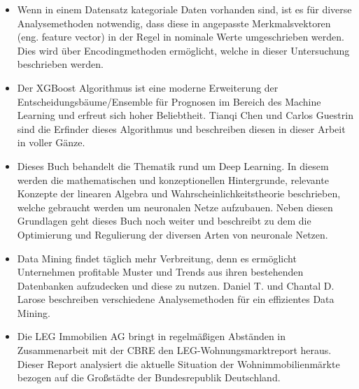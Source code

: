 \begin{itemize}
    \item Wenn in einem Datensatz kategoriale Daten vorhanden sind, ist es für 
    diverse Analysemethoden notwendig, dass diese in angepasste Merkmalsvektoren 
    (eng. feature vector) in der Regel in nominale Werte umgeschrieben werden.
    Dies wird über Encodingmethoden ermöglicht, welche in dieser Untersuchung
    beschrieben werden.
\end{itemize}

\begin{itemize}
    \item Der XGBoost Algorithmus ist eine moderne Erweiterung der 
    Entscheidungsbäume/Ensemble für Prognosen im Bereich des Machine Learning und 
    erfreut sich hoher Beliebtheit. Tianqi Chen und Carlos Guestrin sind die Erfinder 
    dieses Algorithmus und beschreiben diesen in dieser Arbeit in voller Gänze.
\end{itemize}
\newpage
{}
\begin{itemize}
    \item Dieses Buch behandelt die Thematik rund um Deep Learning. In diesem werden die
    mathematischen und konzeptionellen Hintergrunde, relevante Konzepte der 
    linearen Algebra und Wahrscheinlichkeitstheorie beschrieben, welche gebraucht werden um neuronalen
    Netze aufzubauen. Neben diesen Grundlagen geht dieses Buch noch weiter und beschreibt zu dem
    die Optimierung und Regulierung der diversen Arten von neuronale Netzen.
\end{itemize}

\begin{itemize}
    \item Data Mining findet täglich mehr Verbreitung, denn es ermöglicht Unternehmen 
    profitable Muster und Trends aus ihren bestehenden Datenbanken aufzudecken und diese zu
    nutzen. Daniel T. und Chantal D. Larose beschreiben verschiedene Analysemethoden für
    ein effizientes Data Mining.
\end{itemize}

\begin{itemize}
    \item Die LEG Immobilien AG bringt in regelmäßigen Abständen in Zusammenarbeit mit der 
    CBRE den LEG-Wohnungsmarktreport heraus. Dieser Report analysiert die aktuelle Situation 
    der Wohnimmobilienmärkte bezogen auf die Großstädte der Bundesrepublik Deutschland.
\end{itemize}

